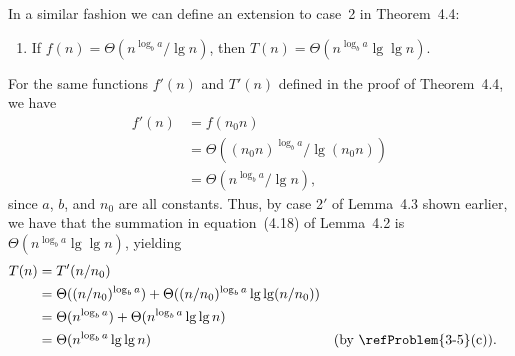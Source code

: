 In a similar fashion we can define an extension to case~2 in Theorem~4.4:
\begin{enumerate}[start=2,label=\arabic*$'$.]
    \item If $f(n)=\Theta(n^{\log_ba}/\lg n)$, then $T(n)=\Theta(n^{\log_ba}\lg\lg n)$.
\end{enumerate}
For the same functions $f'(n)$ and $T'(n)$ defined in the proof of Theorem~4.4, we have
\begin{align*}
    f'(n) &= f(n_0n) \\
    &= \Theta((n_0n)^{\log_ba}/\lg(n_0n)) \\
    &= \Theta(n^{\log_ba}/\lg n),
\end{align*}
since $a$, $b$, and $n_0$ are all constants.
Thus, by case 2$'$ of Lemma~4.3 shown earlier, we have that the summation in equation~(4.18) of Lemma~4.2 is $\Theta(n^{\log_ba}\lg\lg n)$, yielding
\begin{align*}
    T(n) &= T'(n/n_0) \\
    &= \Theta((n/n_0)^{\log_ba})+\Theta((n/n_0)^{\log_ba}\lg\lg(n/n_0)) \\
    &= \Theta(n^{\log_ba})+\Theta(n^{\log_ba}\lg\lg n) \\
    &= \Theta(n^{\log_ba}\lg\lg n) && \text{(by \refProblem{3-5}(c))}.
\end{align*}
